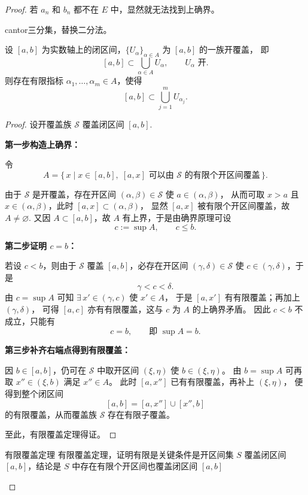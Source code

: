 \documentclass[lang=cn,10pt]{elegantbook}
\begin{document}
\begin{proof}
若 $a_n$ 和 $b_n$ 都不在 $E$ 中，显然就无法找到上确界。\\
\begin{definition}
    cantor三分集，替换二分法。
\end{definition}
\begin{theorem}[有限覆盖定理]\label{thm:HB-interval}
设 $[a,b]$ 为实数轴上的闭区间，$\{U_\alpha\}_{\alpha\in A}$ 为 $[a,b]$ 的一族开覆盖，
即
\[
  [a,b] \subset \bigcup_{\alpha\in A} U_\alpha,\qquad
  U_\alpha \text{ 开}.
\]
则存在有限指标 $\alpha_1,\dots,\alpha_m\in A$，使得
\[
  [a,b] \subset \bigcup_{j=1}^m U_{\alpha_j}.
\]
\end{theorem}
\begin{proof}
设开覆盖族 $\mathcal{S}$ 覆盖闭区间 $[a,b]$.
\medskip

\noindent\textbf{第一步\;构造上确界：}

令
\[
  A=\bigl\{\,x \mid x\in[a,b],\;[a,x]\text{ 可以由 }\mathcal{S}
  \text{ 的有限个开区间覆盖}\,\bigr\}.
\]

由于 $\mathcal{S}$ 是开覆盖，存在开区间 $(\alpha,\beta)\in\mathcal{S}$ 使 $a\in(\alpha,\beta)$，
从而可取 $x>a$ 且 $x\in(\alpha,\beta)$，此时 $[a,x]\subset(\alpha,\beta)$，
显然 $[a,x]$ 被有限个开区间覆盖，故 $A\neq\varnothing$.
又因 $A\subset[a,b]$，故 $A$ 有上界，于是由确界原理可设
\[
  c:=\sup A,\qquad c\le b.
\]

\noindent\textbf{第二步\;证明 $c=b$：}

若设 $c<b$，则由于 $\mathcal{S}$ 覆盖 $[a,b]$，必存在开区间
$(\gamma,\delta)\in\mathcal{S}$ 使 $c\in(\gamma,\delta)$，于是
\[
  \gamma < c < \delta.
\]
由 $c=\sup A$ 可知 $\exists\,x'\in(\gamma,c)$ 使 $x'\in A$，
于是 $[a,x']$ 有有限覆盖；再加上 $(\gamma,\delta)$，
可得 $[a,c]$ 亦有有限覆盖，这与 $c$ 为 $A$ 的上确界矛盾。
因此 $c<b$ 不成立，只能有
\[
  c=b,\qquad\text{即 } \sup A = b.
\]

\noindent\textbf{第三步\;补齐右端点得到有限覆盖：}

因 $b\in[a,b]$，仍可在 $\mathcal{S}$ 中取开区间 $(\xi,\eta)$ 使 $b\in(\xi,\eta)$。
由 $b=\sup A$ 可再取 $x''\in(\xi,b)$ 满足 $x''\in A$。
此时 $[a,x'']$ 已有有限覆盖，再补上 $(\xi,\eta)$，
便得到整个闭区间
\[
  [a,b]=[a,x'']\cup[x'',b]
\]
的有限覆盖，从而覆盖族 $\mathcal{S}$ 存在有限子覆盖。

至此，有限覆盖定理得证。
\end{proof}
\begin{dxtips}{有限覆盖定理}
有限覆盖定理，证明有限是关键条件是开区间集 $S$ 覆盖闭区间 $[a,b]$，结论是 $S$ 中存在有限个开区间也覆盖闭区间 $[a,b]$


\end{dxtips}
\end{proof}
\end{document}
